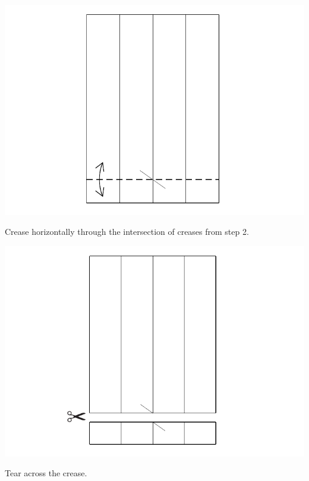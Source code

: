 \documentclass[11pt]{article}
\begin{document}
\begin{minipage}[t]{0.45\textwidth}
  \includegraphics[width=\textwidth]{../figs/fig03-04}
  \begin{itemize}{\item[4.] Crease horizontally through the intersection of creases from step 2.}\end{itemize}
\end{minipage}
\hfill
\begin{minipage}[t]{0.45\textwidth}
  \includegraphics[width=\textwidth]{../figs/fig03-05}
  \begin{itemize}{\item[5.] Tear across the crease.}\end{itemize}
\end{minipage}

\vspace*{0.5in}
\end{document}
